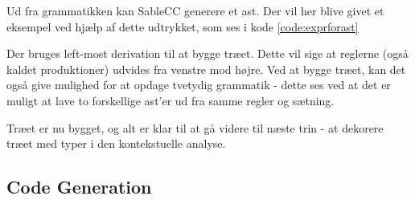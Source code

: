 

\noindent Ud fra grammatikken kan SableCC generere et \gls{ast}. Der vil her blive givet et eksempel ved hjælp af dette udtrykket, som ses i kode \ref{code:exprforast}


\noindent Der bruges left-most derivation til at bygge træet. Dette vil sige at reglerne (også kaldet produktioner) udvides fra venstre mod højre. Ved at bygge træet, kan det også give mulighed for at opdage tvetydig grammatik - dette ses ved at det er muligt at lave to forskellige \gls{ast}'er ud fra samme regler og sætning.


\noindent Træet er nu bygget, og alt er klar til at gå videre til næste trin - at dekorere træet med typer i den kontekstuelle analyse.

\subsection{Code Generation}
